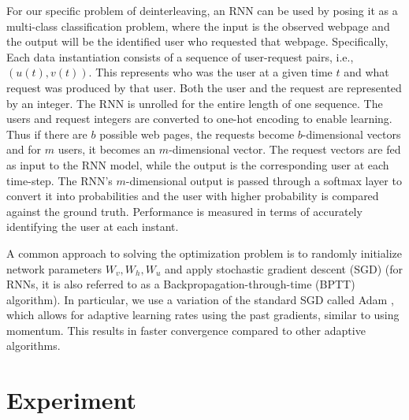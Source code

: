 \documentclass[conference]{IEEEtran}
\begin{document}
	
	For our specific problem of deinterleaving, an RNN can be used by posing it as a multi-class classification problem, where the input is the observed webpage and the output will be the identified user who requested that webpage. Specifically, Each data instantiation consists of a sequence of user-request pairs, i.e., $(u(t), v(t))$. 
	This represents who was the user at a given time $t$ and what request was produced by that user. Both the user and the request are represented by an integer. The RNN is unrolled for the entire length of one sequence. The users and request integers are converted to one-hot encoding to enable learning. Thus if there are $b$ possible web pages, the requests become $b$-dimensional vectors and for $m$ users, it becomes an $m$-dimensional vector. The request vectors are fed as input to the RNN model, while the output is the corresponding user at each time-step. The RNN’s $m$-dimensional output is passed through a softmax layer to convert it into probabilities and the user with higher probability is compared against the ground truth. Performance is measured in terms of accurately identifying the user at each instant.
	
	A common approach to solving the optimization problem is to randomly initialize network parameters $W_v, W_h, W_u$ and apply stochastic gradient descent (SGD) (for RNNs, it is also referred to as a Backpropagation-through-time (BPTT) algorithm). In particular, we use a variation of the standard SGD called Adam \cite{kingma2014adam}, which allows for adaptive learning rates using the past gradients, similar to using momentum. This results in faster convergence compared to other adaptive algorithms.
	
	
	
	\section{Experiment}
	
\end{document}
